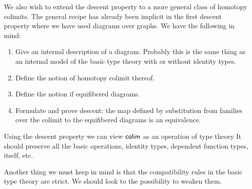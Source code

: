 We also wish to extend the descent property to a more general class of homotopy
colimits. The general recipe has already been implicit in the first descent
property where we have used diagrams over graphs. We have the following in mind:
\begin{enumerate}
\item Give an internal description of a diagram. Probably this is the same thing
      as an internal model of the basic type theory with or without identity types.
\item Define the notion of homotopy colimit thereof.
\item Define the notion if equifibered diagrams.
\item Formulate and prove descent: the map defined by substitution
 from families over the colimit to the equifibered diagrams is an equivalence.
\end{enumerate}

Using the descent property we can view $\mathsf{colim}$ as an operation of type theory
It should preserve all the basic operations, identity types, dependent function
types, itself, etc.

Another thing we must keep in mind is that the compatibility rules in the basic
type theory are strict. We should look to the possibility to weaken them.
